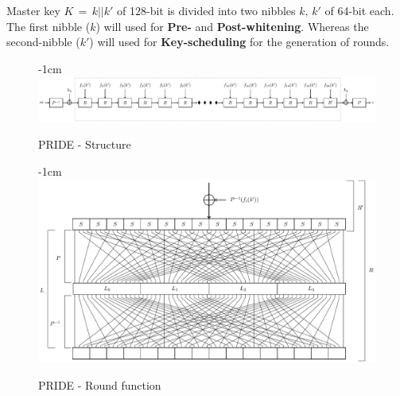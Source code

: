 \documentclass{transcrypto}
\begin{document}
	Master key $K\,=\,k||k'$ of 128-bit is divided into two nibbles $k,\,k'$ of 64-bit each. The first nibble ($ k $) will used for \textbf{Pre-} and \textbf{Post-whitening}. Whereas the second-nibble ($ k' $) will used for \textbf{Key-scheduling} for the generation of rounds.
	\begin{figure}[H]
		\addtolength{\leftskip} {-1cm}
		\addtolength{\rightskip}{-1.5cm}
		\includegraphics[width=16cm]{structure.pdf}
		\caption{PRIDE - Structure}
		\label{fig1}
	\end{figure}
	\begin{figure}[H]
		\addtolength{\leftskip} {-1cm}
		\addtolength{\rightskip}{-3.5cm}
		\includegraphics[width=15cm]{pride.pdf}
		\caption{PRIDE - Round function}
		\label{fig2}
	\end{figure}
\end{document}
